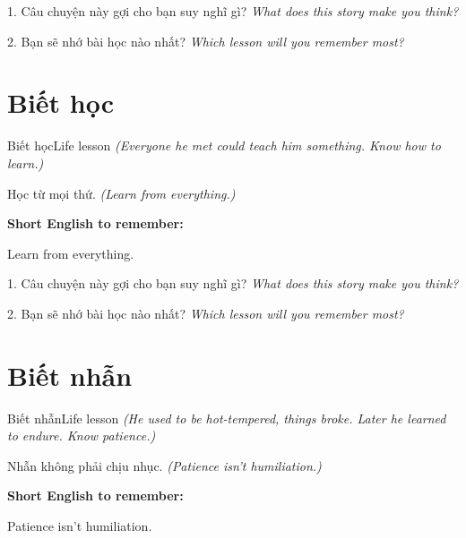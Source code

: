 \begin{tuhocnhanh}
1. Câu chuyện này gợi cho bạn suy nghĩ gì? \textit{What does this story make you think?}

2. Bạn sẽ nhớ bài học nào nhất? \textit{Which lesson will you remember most?}
\end{tuhocnhanh}
\ngancach


\section{Biết học}
\begin{truyen}{Biết học}{Life lesson}
\textit{(Everyone he met could teach him something. Know how to learn.)}
\end{truyen}

\begin{baihoc}
Học từ mọi thứ.
\textit{(Learn from everything.)}
\end{baihoc}

\begin{ghinhoanh}
\textbf{Short English to remember:}

Learn from everything.

\end{ghinhoanh}

\begin{tuhocnhanh}
1. Câu chuyện này gợi cho bạn suy nghĩ gì? \textit{What does this story make you think?}

2. Bạn sẽ nhớ bài học nào nhất? \textit{Which lesson will you remember most?}
\end{tuhocnhanh}
\ngancach


\section{Biết nhẫn}
\begin{truyen}{Biết nhẫn}{Life lesson}
\textit{(He used to be hot-tempered, things broke. Later he learned to endure. Know patience.)}
\end{truyen}

\begin{baihoc}
Nhẫn không phải chịu nhục.
\textit{(Patience isn't humiliation.)}
\end{baihoc}

\begin{ghinhoanh}
\textbf{Short English to remember:}

Patience isn't humiliation.

\end{ghinhoanh}

